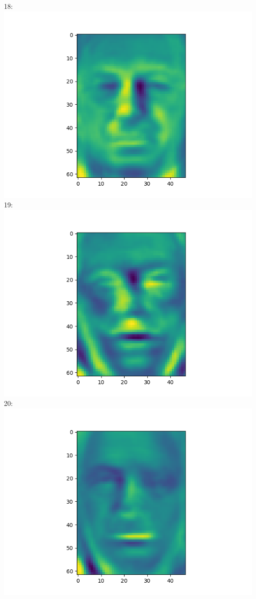 \documentclass[twoside,10pt]{article}
\theoremstyle{definition}
\theoremstyle{definition}
\theoremstyle{remark}
\renewcommand{\>}{{\rightarrow}}
\newcommand{\1}{{\mathbf 1}}
\newcommand{\0}{{\mathbf 0}}
\begin{document}
\begin{enumerate}
  18:
  \includegraphics[width=\textwidth]{eigenface_18.png}
  19:
  \includegraphics[width=\textwidth]{eigenface_19.png}
  20:
  \includegraphics[width=\textwidth]{eigenface_20.png}

\end{enumerate}
\end{document}
